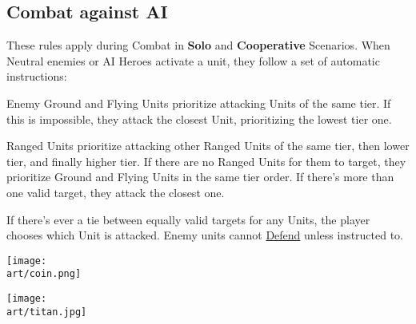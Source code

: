 \begin{multicols}{2}
\subsection*{Combat against AI}

These rules apply during Combat in \textbf{Solo} and \textbf{Cooperative} Scenarios.
When Neutral enemies or AI Heroes activate a unit, they follow a set of automatic instructions:\par

Enemy Ground  and Flying  Units prioritize attacking Units of the same tier.
If this is impossible, they attack the closest Unit, prioritizing the lowest tier one.\par
Ranged  Units prioritize attacking other Ranged  Units of the same tier, then lower tier, and finally higher tier.
If there are no Ranged  Units for them to target, they prioritize Ground  and Flying  Units in the same tier order.
If there's more than one valid target, they attack the closest one.\par
If there's ever a tie between equally valid targets for any Units, the player chooses which Unit is attacked.
Enemy units cannot \hyperlink{Defend}{Defend} unless instructed to.

\vfill

\texttt{[image: \\art/coin.png]}

\begin{center}
    \texttt{[image: \\art/titan.jpg]}
\end{center}

\end{multicols}
